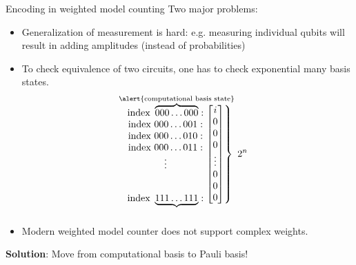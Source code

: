 \begin{frame}{Encoding in weighted model counting}
Two major problems:
\begin{itemize}
  \item Generalization of measurement is hard: e.g. measuring individual qubits will result in adding amplitudes (instead of probabilities)
  \item To check equivalence of two circuits, one has to check \alert{exponential many basis states}.
 		\[
  \begin{matrix*}[c]
  \text{index }\overbrace{000\dots000}^{\mathclap{\text{\alert{computational basis state}}}}:\\\text{index }{000\dots001}:\\\text{index }{000\dots010}:\\\text{index }{000\dots011}:\\\vdots\vspace{1em}\\\\\text{index }\underbrace{111\dots111}_{\vspace{3em}}:\\
  \end{matrix*}
  \left.
  \begin{bmatrix*}[c]
   i \\0 \\ 0\\ 0 \\ \vdots \\ 0 \\ 0\\ 0  \\
  \end{bmatrix*}
  \right\}\text{ $2^n$}
\]
\item Modern weighted model counter does not support \alert{complex weights}.
\end{itemize}

\pause
\vspace{2em}
{\color{red}\textbf{Solution}: Move from computational basis to Pauli basis!}

\end{frame}












